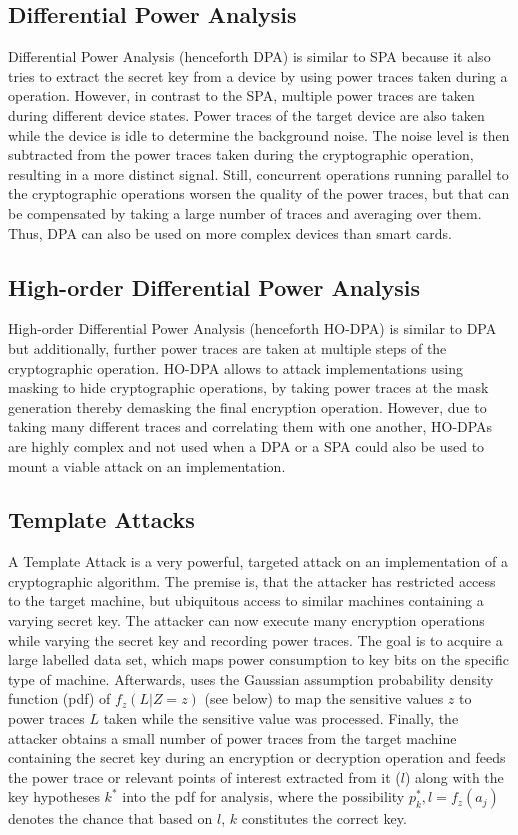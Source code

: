 \documentclass[journal]{IEEEtran}
\begin{document}
\subsection{Differential Power Analysis}
Differential Power Analysis (henceforth DPA) is similar to SPA because it also tries to extract the secret key from a device by using power traces taken during a operation. However, in contrast to the SPA, multiple power traces are taken during different device states. Power traces of the target device are also taken while the device is idle to determine the background noise. The noise level is then subtracted from the power traces taken during the cryptographic operation, resulting in a more distinct signal. Still, concurrent operations running parallel to the cryptographic operations worsen the quality of the power traces, but that can be compensated by taking a large number of traces and averaging over them. Thus, DPA can also be used on more complex devices than smart cards.

\subsection{High-order Differential Power Analysis}
High-order Differential Power Analysis (henceforth HO-DPA) is similar to DPA but additionally, further power traces are taken at multiple steps of the cryptographic operation. HO-DPA allows to attack implementations using masking to hide cryptographic operations, by taking power traces at the mask generation thereby demasking the final encryption operation. However, due to taking many different traces and correlating them with one another, HO-DPAs are highly complex and not used when a DPA or a SPA could also be used to mount a viable attack on an implementation.

\subsection{Template Attacks}
\label{subsec:template}
A Template Attack is a very powerful, targeted attack on an implementation of a cryptographic algorithm. The premise is, that the attacker has restricted access to the target machine, but ubiquitous access to similar machines containing a varying secret key. The attacker can now execute many encryption operations while varying the secret key and recording power traces. The goal is to acquire a large labelled data set, which maps power consumption to key bits on the specific type of machine. Afterwards, uses the Gaussian assumption probability density function (pdf) of $ f_z(L|Z=z) $ (see below) to map the sensitive values $ z $ to power traces $ L $ taken while the sensitive value was processed. Finally, the attacker obtains a small number of power traces from the target machine containing the secret key during an encryption or decryption operation and feeds the power trace or relevant points of interest extracted from it ($ l $) along with the key hypotheses $ k^{*} $ into the pdf for analysis, where the possibility $ p_k^{*},l=f_z(a_j) $ denotes the chance that based on $ l $, $ k $ constitutes the correct key. 
\end{document}
